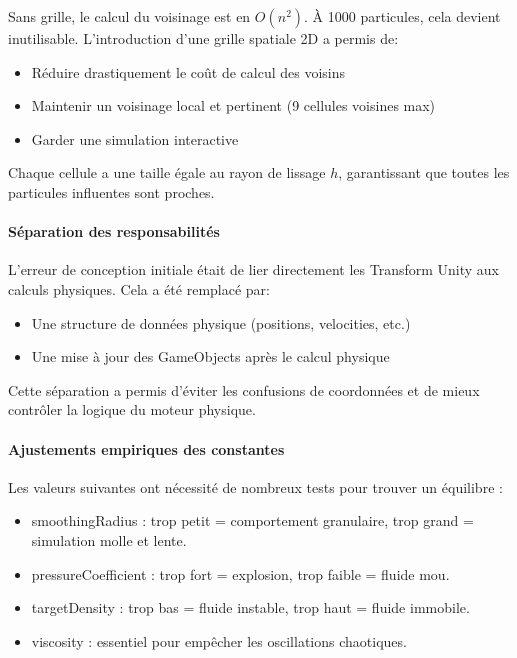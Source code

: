 \documentclass{article}
\begin{document}
Sans grille, le calcul du voisinage est en \(O(n^2)\). À 1000 particules, cela devient inutilisable. L’introduction d’une grille spatiale 2D a permis de:

\begin{itemize}
    \item Réduire drastiquement le coût de calcul des voisins
    \item Maintenir un voisinage local et pertinent (9 cellules voisines max)
    \item Garder une simulation interactive
\end{itemize}

Chaque cellule a une taille égale au rayon de lissage \(h\), garantissant que toutes les particules influentes sont proches.

\paragraph{Séparation des responsabilités}

L’erreur de conception initiale était de lier directement les Transform Unity aux calculs physiques. Cela a été remplacé par:

\begin{itemize}
    \item Une structure de données physique (positions, velocities, etc.)
    \item Une mise à jour des GameObjects après le calcul physique
\end{itemize}

Cette séparation a permis d'éviter les confusions de coordonnées et de mieux contrôler la logique du moteur physique.

\paragraph{Ajustements empiriques des constantes}

Les valeurs suivantes ont nécessité de nombreux tests pour trouver un équilibre :

\begin{itemize}
    \item smoothingRadius : trop petit = comportement granulaire, trop grand = simulation molle et lente.
    \item pressureCoefficient : trop fort = explosion, trop faible = fluide mou.
    \item targetDensity : trop bas = fluide instable, trop haut = fluide immobile.
    \item viscosity : essentiel pour empêcher les oscillations chaotiques.
\end{itemize}
\end{document}

